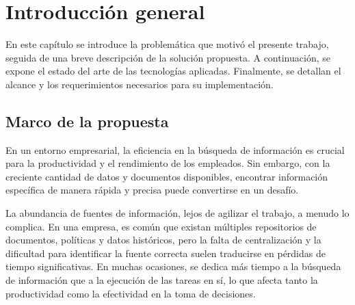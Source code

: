 
\chapter{Introducción general} %

\label{Chapter1} %
\label{IntroGeneral}


\newcommand{\keyword}[1]{\textbf{#1}}
\newcommand{\tabhead}[1]{\textbf{#1}}
\newcommand{\code}[1]{\texttt{#1}}
\newcommand{\file}[1]{\texttt{\bfseries#1}}
\newcommand{\option}[1]{\texttt{\itshape#1}}
\newcommand{\grados}{$^{\circ}$}


En este capítulo se introduce la problemática que motivó el presente trabajo, seguida de una breve descripción de la solución propuesta. 
A continuación, se expone el estado del arte de las tecnologías aplicadas. 
Finalmente, se detallan el alcance y los requerimientos necesarios para su implementación.

\section{Marco de la propuesta}

En un entorno empresarial, la eficiencia en la búsqueda de información es crucial para la
productividad y el rendimiento de los empleados. Sin embargo, con la creciente cantidad de
datos y documentos disponibles, encontrar información específica de manera rápida y precisa
puede convertirse en un desafío.

La abundancia de fuentes de información, lejos de agilizar el trabajo, a menudo lo complica. En una empresa, 
es común que existan múltiples repositorios de documentos, políticas y datos históricos, pero la falta de centralización y la 
dificultad para identificar la fuente correcta suelen traducirse en pérdidas de tiempo significativas. 
En muchas ocasiones, se dedica más tiempo a la búsqueda de información que a la ejecución de las tareas 
en sí, lo que afecta tanto la productividad como la efectividad en la toma de decisiones.

